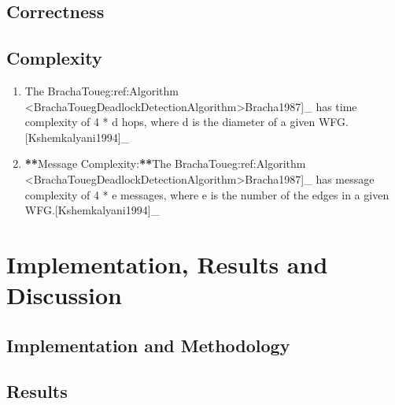 \documentclass[letterpaper,10pt,english]{sphinxmanual}
\begin{document}
\subsection{Correctness}
\label{\detokenize{docs/BrachaTouegAlg/algorithm:correctness}}

\subsection{Complexity}
\label{\detokenize{docs/BrachaTouegAlg/algorithm:complexity}}\begin{enumerate}
%
\item {} 
\sphinxAtStartPar
{} The Bracha\sphinxhyphen{}Toueg:ref:{\color{red}\bfseries{}\textasciigrave{}}Algorithm \textless{}BrachaTouegDeadlockDetectionAlgorithm\textgreater{}\textasciigrave{}{[}Bracha1987{]}\_  has time complexity of 4 * d hops, where d is the diameter of a given WFG.{[}Kshemkalyani1994{]}\_

\item {} 
\sphinxAtStartPar
{\color{red}\bfseries{}**}Message Complexity:{\color{red}\bfseries{}**}The Bracha\sphinxhyphen{}Toueg:ref:{\color{red}\bfseries{}\textasciigrave{}}Algorithm \textless{}BrachaTouegDeadlockDetectionAlgorithm\textgreater{}\textasciigrave{}{[}Bracha1987{]}\_  has message complexity of 4 * e messages, where e is the number of the edges in a given WFG.{[}Kshemkalyani1994{]}\_

\end{enumerate}

\sphinxstepscope


\section{Implementation, Results and Discussion}
\label{\detokenize{docs/BrachaTouegAlg/results:implementation-results-and-discussion}}\label{\detokenize{docs/BrachaTouegAlg/results::doc}}

\subsection{Implementation and Methodology}
\label{\detokenize{docs/BrachaTouegAlg/results:implementation-and-methodology}}

\subsection{Results}
\label{\detokenize{docs/BrachaTouegAlg/results:results}}
\end{document}

